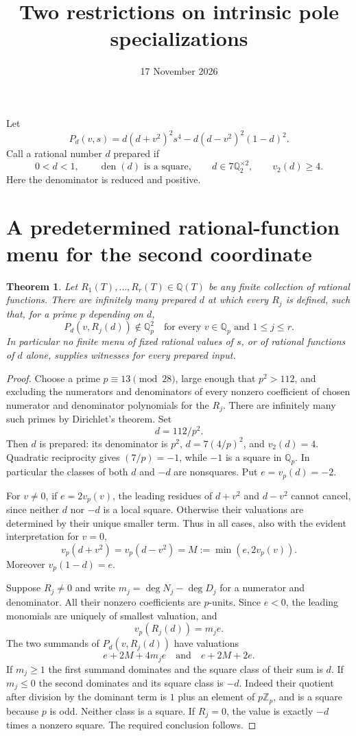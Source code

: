 \documentclass[11pt,a4paper]{article}
\newtheorem{theorem}{Theorem}
\newcommand{\Q}{\mathbb Q}
\begin{document}
\title{Two restrictions on intrinsic pole specializations}
\author{}\date{17 November 2026}\maketitle
Let
\[
 P_d(v,s)=d(d+v^2)^2s^4-d(d-v^2)^2(1-d)^2.
\]
Call a rational number $d$ prepared if
\[
 0<d<1,\qquad \operatorname{den}(d)\text{ is a square},\qquad
 d\in 7\Q_2^{\times2},\qquad v_2(d)\ge4.
\]
Here the denominator is reduced and positive.

\section{A predetermined rational-function menu for the second coordinate}

\begin{theorem}\label{thm:menu}
Let $R_1(T),\ldots,R_r(T)\in\Q(T)$ be any finite collection of rational functions. There are infinitely many prepared $d$ at which every $R_j$ is defined, such that, for a prime $p$ depending on $d$,
\[
 P_d(v,R_j(d))\notin\Q_p^2
 \quad\text{for every }v\in\Q_p\text{ and }1\le j\le r.
\]
In particular no finite menu of fixed rational values of $s$, or of rational functions of $d$ alone, supplies witnesses for every prepared input.
\end{theorem}

\begin{proof}
Choose a prime $p\equiv13\pmod{28}$, large enough that $p^2>112$, and excluding the numerators and denominators of every nonzero coefficient of chosen numerator and denominator polynomials for the $R_j$. There are infinitely many such primes by Dirichlet's theorem. Set
\[
 d=112/p^2.
\]
Then $d$ is prepared: its denominator is $p^2$, $d=7(4/p)^2$, and $v_2(d)=4$. Quadratic reciprocity gives $(7/p)=-1$, while $-1$ is a square in $\Q_p$. In particular the classes of both $d$ and $-d$ are nonsquares. Put $e=v_p(d)=-2$.

For $v\ne0$, if $e=2v_p(v)$, the leading residues of $d+v^2$ and $d-v^2$ cannot cancel, since neither $d$ nor $-d$ is a local square. Otherwise their valuations are determined by their unique smaller term. Thus in all cases, also with the evident interpretation for $v=0$,
\[
 v_p(d+v^2)=v_p(d-v^2)=M:=\min(e,2v_p(v)).
\]
Moreover $v_p(1-d)=e$.

Suppose $R_j\ne0$ and write $m_j=\deg N_j-\deg D_j$ for a numerator and denominator. All their nonzero coefficients are $p$-units. Since $e<0$, the leading monomials are uniquely of smallest valuation, and
\[
 v_p(R_j(d))=m_je.
\]
The two summands of $P_d(v,R_j(d))$ have valuations
\[
 e+2M+4m_je\quad\text{and}\quad e+2M+2e.
\]
If $m_j\ge1$ the first summand dominates and the square class of their sum is $d$. If $m_j\le0$ the second dominates and its square class is $-d$. Indeed their quotient after division by the dominant term is $1$ plus an element of $p\mathbb Z_p$, and is a square because $p$ is odd. Neither class is a square. If $R_j=0$, the value is exactly $-d$ times a nonzero square. The required conclusion follows.
\end{proof}
\end{document}
